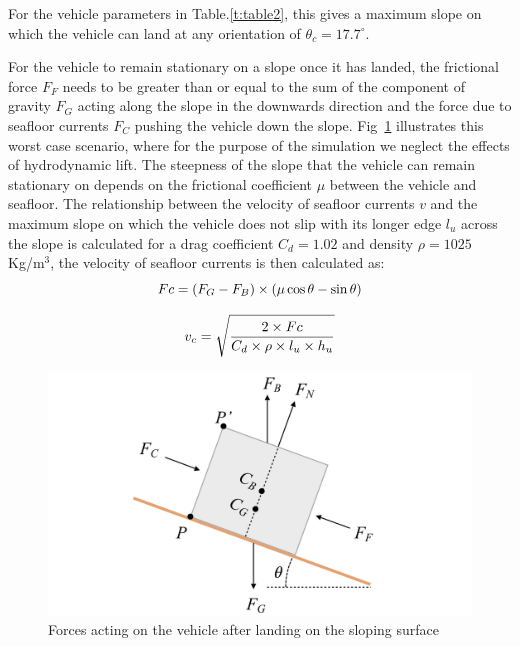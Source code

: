 \noindent For the vehicle parameters in Table.\ref{t:table2}, this gives a maximum slope on which the vehicle can land at any orientation of $\theta_c=17.7^\circ$.

For the vehicle to remain stationary on a slope once it has landed, the frictional force $F_F$ needs to be greater than or equal to the sum of the component of gravity $F_G$ acting along the slope in the downwards direction and the force due to seafloor currents $F_C$ pushing the vehicle down the slope. Fig~\ref{f:mehul9} illustrates this worst case scenario, where for the purpose of the simulation we neglect the effects of hydrodynamic lift. The steepness of the slope that the vehicle can remain stationary on depends on the frictional coefficient $\mu$ between the vehicle and seafloor. The relationship between the velocity of seafloor currents $v$ and the maximum slope on which the vehicle does not slip with its longer edge $l_u$ across the slope is calculated for a drag coefficient $C_d = 1.02$ and density $\rho= 1025$ Kg/m$^3$, the velocity of seafloor currents is then calculated as:
\begin{equation}
\label{eq:eq3}
\centering
	Fc = (F_G - F_B) \times (\mu \cos\theta - \sin\theta)
\end{equation}

\begin{equation}
\label{eq:eq4}
\centering
	v_c = \sqrt{ \frac{2 \times Fc}{C_d  \times  \rho  \times  l_u \times h_u}}
\end{equation}

\begin{figure}[!ht]
\centering
\includegraphics[width=6in]{./images/mehul9.png}
\caption{Forces acting on the vehicle after landing on the sloping surface}
\label{f:mehul9}
\end{figure}

